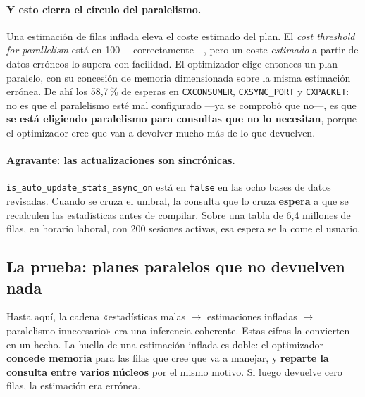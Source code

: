 \documentclass[11pt,a4paper]{article}
\newcommand{\cod}[1]{\texttt{\small #1}}
\begin{document}
\paragraph{Y esto cierra el círculo del paralelismo.} Una estimación de filas
inflada eleva el coste estimado del plan. El \emph{cost threshold for
parallelism} está en 100 —correctamente—, pero un coste \emph{estimado} a
partir de datos erróneos lo supera con facilidad. El optimizador elige
entonces un plan paralelo, con su concesión de memoria dimensionada sobre la
misma estimación errónea. De ahí los 58,7\,\% de esperas en
\cod{CXCONSUMER}, \cod{CXSYNC\_PORT} y \cod{CXPACKET}: no es que el
paralelismo esté mal configurado —ya se comprobó que no—, es que \textbf{se
está eligiendo paralelismo para consultas que no lo necesitan}, porque el
optimizador cree que van a devolver mucho más de lo que devuelven.

\paragraph{Agravante: las actualizaciones son sincrónicas.}
\cod{is\_auto\_update\_stats\_async\_on} está en \cod{false} en las ocho bases
de datos revisadas. Cuando se cruza el umbral, la consulta que lo cruza
\textbf{espera} a que se recalculen las estadísticas antes de compilar. Sobre
una tabla de 6,4 millones de filas, en horario laboral, con 200 sesiones
activas, esa espera se la come el usuario.

\subsection{La prueba: planes paralelos que no devuelven nada}
\label{sec:prueba}

Hasta aquí, la cadena «estadísticas malas $\rightarrow$ estimaciones infladas
$\rightarrow$ paralelismo innecesario» era una inferencia coherente. Estas
cifras la convierten en un hecho. La huella de una estimación inflada es doble:
el optimizador \textbf{concede memoria} para las filas que cree que va a
manejar, y \textbf{reparte la consulta entre varios núcleos} por el mismo
motivo. Si luego devuelve cero filas, la estimación era errónea.
\end{document}
